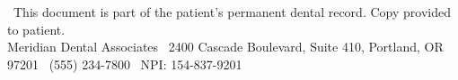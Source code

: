 \documentclass[11pt,a4paper]{article}
\begin{document}
\vspace{5mm}
\begin{center}
  {\small\color{softgray}\faFile\  This document is part of the patient's permanent dental record. Copy provided to patient.}\\[1mm]
  {\footnotesize\color{softgray}Meridian Dental Associates \textbar\  2400 Cascade Boulevard, Suite 410, Portland, OR 97201 \textbar\  (555) 234-7800 \textbar\  NPI: 154-837-9201}
\end{center}
\end{document}
